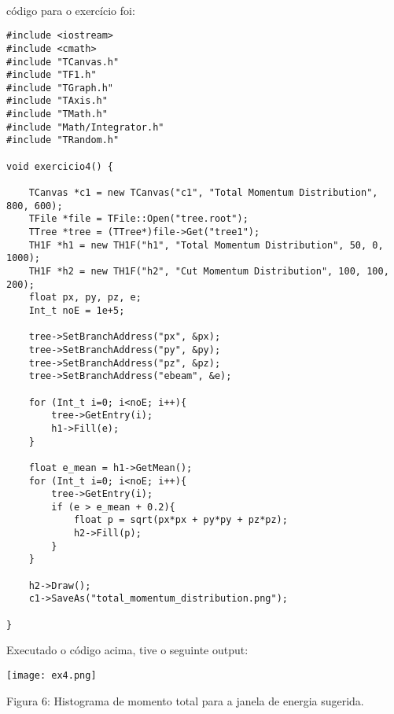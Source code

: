 \documentclass[a4 paper]{article}
\numberwithin{equation}{section}
\newcommand{\problem}[2]{~\\\fbox{\textbf{#1}}\hfill \newline\newline}
\newcommand{\0}{\mathbf{0}}
\begin{document}
\problem{EXERCÍCIO 4 }

O código para o exercício foi:

\begin{lstlisting}
#include <iostream>
#include <cmath>
#include "TCanvas.h"
#include "TF1.h"
#include "TGraph.h"
#include "TAxis.h"
#include "TMath.h"
#include "Math/Integrator.h"
#include "TRandom.h"

void exercicio4() {

	TCanvas *c1 = new TCanvas("c1", "Total Momentum Distribution", 800, 600);
	TFile *file = TFile::Open("tree.root");
	TTree *tree = (TTree*)file->Get("tree1");
	TH1F *h1 = new TH1F("h1", "Total Momentum Distribution", 50, 0, 1000);
	TH1F *h2 = new TH1F("h2", "Cut Momentum Distribution", 100, 100, 200);
	float px, py, pz, e;
	Int_t noE = 1e+5;

	tree->SetBranchAddress("px", &px);
	tree->SetBranchAddress("py", &py);
	tree->SetBranchAddress("pz", &pz);
	tree->SetBranchAddress("ebeam", &e);

	for (Int_t i=0; i<noE; i++){
		tree->GetEntry(i);
		h1->Fill(e);
	}

	float e_mean = h1->GetMean();
	for (Int_t i=0; i<noE; i++){
		tree->GetEntry(i);
		if (e > e_mean + 0.2){
			float p = sqrt(px*px + py*py + pz*pz);
			h2->Fill(p);
		}	
	}

	h2->Draw();
	c1->SaveAs("total_momentum_distribution.png");

}
\end{lstlisting}

Executado o código acima, tive o seguinte output:

\texttt{[image: ex4.png]}
\begin{center}
    Figura 6: Histograma de momento total para a janela de energia sugerida.
\end{center}
\end{document}
